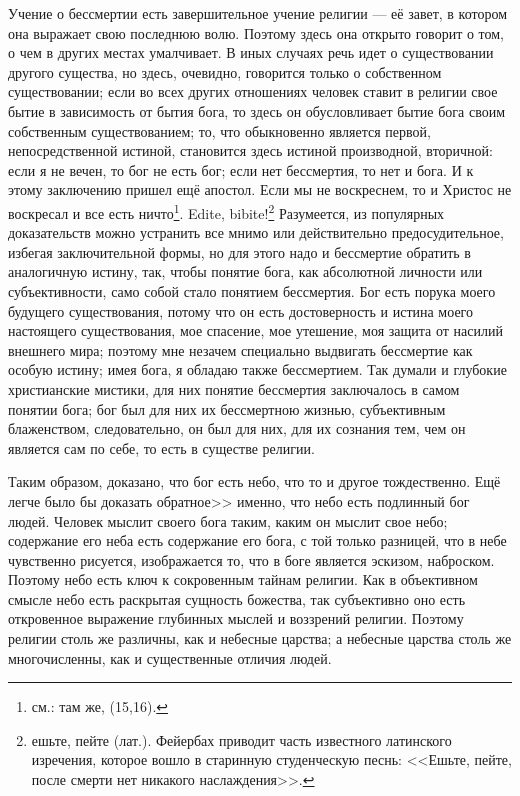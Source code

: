 \documentclass[12pt,oneside]{book}
\begin{document}
Учение о бессмертии есть завершительное учение религии --- её завет, в котором она выражает свою последнюю волю. Поэтому здесь она открыто говорит о том, о чем в других местах умалчивает. В иных случаях речь идет о существовании другого существа, но здесь, очевидно, говорится только о собственном существовании; если во всех других отношениях человек ставит в религии свое бытие в зависимость от бытия бога, то здесь он обусловливает бытие бога своим собственным существованием; то, что обыкновенно является первой, непосредственной истиной, становится здесь истиной производной, вторичной: если я не вечен, то бог не есть бог; если нет бессмертия, то нет и бога. И к этому заключению пришел ещё апостол. Если мы не воскреснем, то и Христос не воскресал и все есть ничто\footnote{см.: там же, (15,16).}. Edite, bibite!\footnote{ешьте, пейте (лат.). Фейербах приводит часть известного латинского изречения, которое вошло в старинную студенческую песнь: <<Ешьте, пейте, после смерти нет никакого наслаждения>>.} Разумеется, из популярных доказательств можно устранить все мнимо или действительно предосудительное, избегая заключительной формы, но для этого надо и бессмертие обратить в аналогичную истину, так, чтобы понятие бога, как абсолютной личности или субъективности, само собой стало понятием бессмертия. Бог есть порука моего будущего существования, потому что он есть достоверность и истина моего настоящего существования, мое спасение, мое утешение, моя защита от насилий внешнего мира; поэтому мне незачем специально выдвигать бессмертие как особую истину; имея бога, я обладаю также бессмертием. Так думали и глубокие христианские мистики, для них понятие бессмертия заключалось в самом понятии бога; бог был для них их бессмертною жизнью, субъективным блаженством, следовательно, он был для них, для их сознания тем, чем он является сам по себе, то есть в существе религии.

Таким образом, доказано, что бог есть небо, что то и другое тождественно. Ещё легче было бы доказать обратное>> именно, что небо есть подлинный бог людей. Человек мыслит своего бога таким, каким он мыслит свое небо; содержание его неба есть содержание его бога, с той только разницей, что в небе чувственно рисуется, изображается то, что в боге является эскизом, наброском. Поэтому небо есть ключ к сокровенным тайнам религии. Как в объективном смысле небо есть раскрытая сущность божества, так субъективно оно есть откровенное выражение глубинных мыслей и воззрений религии. Поэтому религии столь же различны, как и небесные царства; а небесные царства столь же многочисленны, как и существенные отличия людей.
\end{document}

